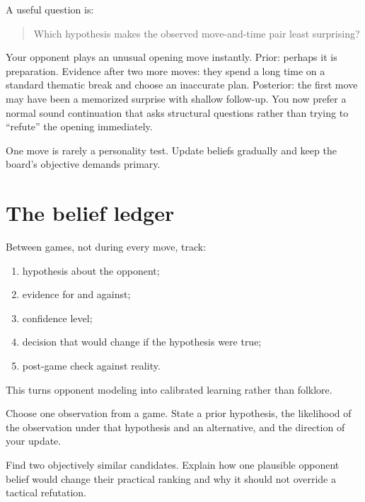A useful question is:

\begin{quote}
Which hypothesis makes the observed move-and-time pair least surprising?
\end{quote}

\begin{workedbox}[title={Worked example: updating without overreacting}]
Your opponent plays an unusual opening move instantly. Prior: perhaps it is preparation. Evidence after two more moves: they spend a long time on a standard thematic break and choose an inaccurate plan. Posterior: the first move may have been a memorized surprise with shallow follow-up. You now prefer a normal sound continuation that asks structural questions rather than trying to ``refute'' the opening immediately.
\end{workedbox}

\begin{warningbox}[title={Narrative overfitting}]
One move is rarely a personality test. Update beliefs gradually and keep the board's objective demands primary.
\end{warningbox}

\section{The belief ledger}
Between games, not during every move, track:

\begin{enumerate}[leftmargin=1.4em]
\item hypothesis about the opponent;
\item evidence for and against;
\item confidence level;
\item decision that would change if the hypothesis were true;
\item post-game check against reality.
\end{enumerate}

This turns opponent modeling into calibrated learning rather than folklore.

\begin{exercise}
Choose one observation from a game. State a prior hypothesis, the likelihood of the observation under that hypothesis and an alternative, and the direction of your update.
\end{exercise}

\begin{exercise}
Find two objectively similar candidates. Explain how one plausible opponent belief would change their practical ranking and why it should not override a tactical refutation.
\end{exercise}

